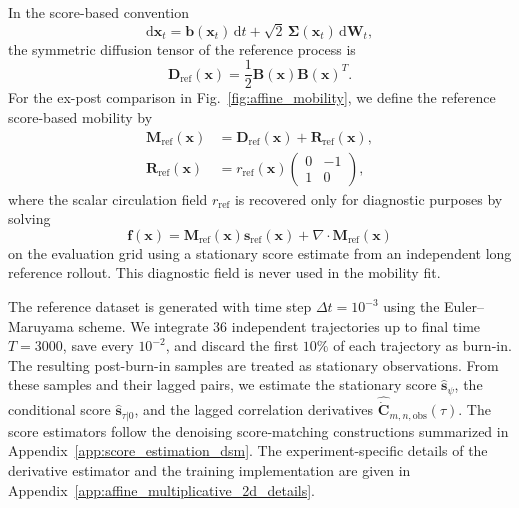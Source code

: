 \documentclass[11pt,twoside,fleqn]{article}
\renewcommand{\d}{\mathrm{d}}
\begin{document}
In the score-based convention
\begin{equation*}
    \d \bm{x}_t
    =
    \bm{b}(\bm{x}_t)\,\d t
    +
    \sqrt{2}\,\bm{\Sigma}(\bm{x}_t)\,\d\bm{W}_t,
\end{equation*}
the symmetric diffusion tensor of the reference process is
\begin{equation}
    \bm{D}_{\mathrm{ref}}(\bm{x})
    =
    \frac{1}{2}\bm{B}(\bm{x})\bm{B}(\bm{x})^T.
    \label{eq:affine_2d_reference_diffusion_tensor_main}
\end{equation}
For the ex-post comparison in Fig.~\ref{fig:affine_mobility}, we define the
reference score-based mobility by
\begin{equation}
\begin{aligned}
    \bm{M}_{\mathrm{ref}}(\bm{x})
    &=
    \bm{D}_{\mathrm{ref}}(\bm{x})
    +
    \bm{R}_{\mathrm{ref}}(\bm{x}),
    \\
    \bm{R}_{\mathrm{ref}}(\bm{x})
    &=
    r_{\mathrm{ref}}(\bm{x})
    \begin{pmatrix}
        0 & -1\\
        1 & 0
    \end{pmatrix},
\end{aligned}
    \label{eq:affine_2d_reference_mobility_main}
\end{equation}
where the scalar circulation field \(r_{\mathrm{ref}}\) is recovered only for
diagnostic purposes by solving
\begin{equation*}
    \bm{f}(\bm{x})
    =
    \bm{M}_{\mathrm{ref}}(\bm{x})\bm{s}_{\mathrm{ref}}(\bm{x})
    +
    \nabla\cdot\bm{M}_{\mathrm{ref}}(\bm{x})
\end{equation*}
on the evaluation grid using a stationary score estimate from an independent
long reference rollout. This diagnostic field is never used in the mobility
fit.

The reference dataset is generated with time step
\(\Delta t=10^{-3}\) using the Euler--Maruyama scheme. We integrate \(36\) independent trajectories up to
final time \(T=3000\), save every \(10^{-2}\), and discard the first
\(10\%\) of each trajectory as burn-in. The resulting post-burn-in samples are
treated as stationary observations. From these samples and their lagged pairs,
we estimate the stationary score \(\widehat{\bm{s}}_\psi\), the conditional
score \(\widehat{\bm{s}}_{\tau|0}\), and the lagged correlation derivatives
\(\widehat{\dot{\bm{C}}}_{m,n,\mathrm{obs}}(\tau)\). The score estimators
follow the denoising score-matching constructions summarized in
Appendix~\ref{app:score_estimation_dsm}. The experiment-specific details of
the derivative estimator and the training implementation are given in
Appendix~\ref{app:affine_multiplicative_2d_details}.
\end{document}
